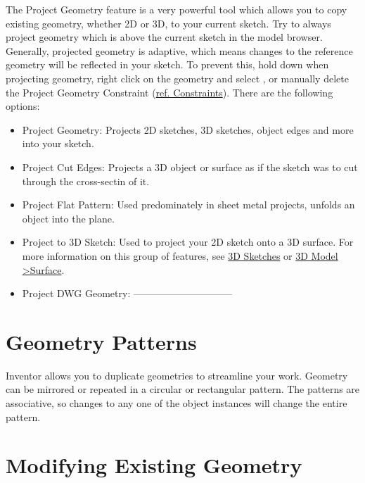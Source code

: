 \cbstart
{}

The Project Geometry feature is a very powerful tool which allows you to copy existing geometry, whether 2D or 3D, to your current sketch. Try to always project geometry which is above the current sketch in the model browser. Generally, projected geometry is adaptive, which means changes to the reference geometry will be reflected in your sketch. To prevent this, hold down  when projecting geometry, right click on the geometry and select , or manually delete the Project Geometry Constraint (\hyperref[chap:constraints]{ref. Constraints}). There are the following options:

\begin{itemize}
\item Project Geometry: Projects 2D sketches, 3D sketches, object edges and more into your sketch.
\item Project Cut Edges: Projects a 3D object or surface as if the sketch was to cut through the cross-sectin of it.
\item Project Flat Pattern: Used predominately in sheet metal projects, unfolds an object into the plane.
\item Project to 3D Sketch: Used to project your 2D sketch onto a 3D surface. For more information on this group of features, see \hyperref[section: 3D Sketches]{3D Sketches} or \hyperref[subsection: 3D Model Surface]{3D Model \textgreater Surface}.
\item Project DWG Geometry:  ------------------------------
\end{itemize}

\cbend

\section{Geometry Patterns}

\cbstart
{}

Inventor allows you to duplicate geometries to streamline your work. Geometry can be mirrored or repeated in a circular or rectangular pattern. The patterns are associative, so changes to any one of the object instances will change the entire pattern.

\cbend

\section{Modifying Existing Geometry}

